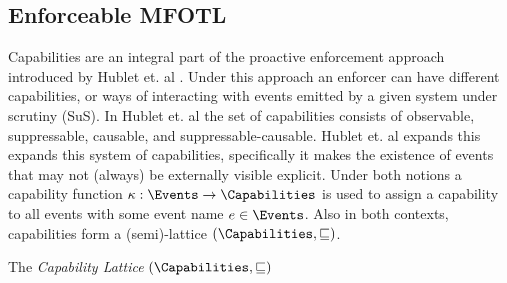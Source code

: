 \subsection{Enforceable MFOTL}
\label{subsection:emfotl}
Capabilities are an integral part of the proactive enforcement
approach introduced by Hublet et. al \cite{whyenf}.
Under this approach an enforcer can have different capabilities, or ways of interacting
with events emitted by a given system under scrutiny (SuS).
In Hublet et. al the set of capabilities consists of observable, suppressable, causable,
and suppressable-causable.
Hublet et. al \cite{lex} expands this expands this system of capabilities, specifically it
makes the existence of events that may not (always) be externally visible explicit.
Under both notions a capability function $\kappa : \Events \to \Capabilities$ is used
to assign a capability to all events with some event name $e \in \Events$.
Also in both contexts, capabilities form a (semi)-lattice $(\Capabilities, \sqsubseteq)$.


\begin{definition}
    \label{def:capability-lattice}
    The \emph{Capability Lattice} $\left( \Capabilities, \sqsubseteq \right)$
    
    \centering
\end{definition}

